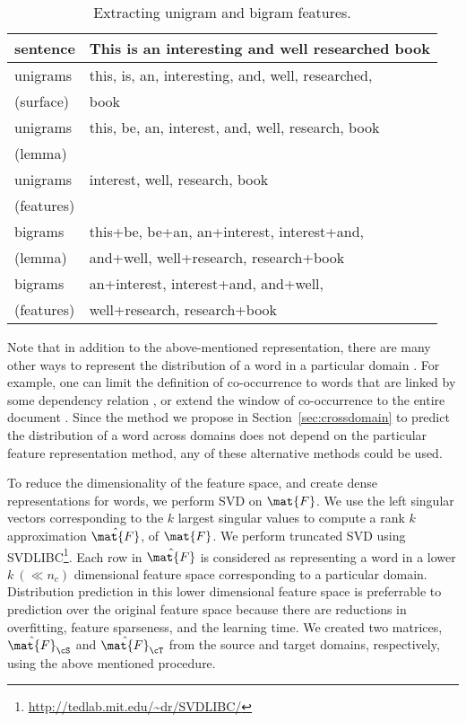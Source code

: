\documentclass[11pt]{article}
\begin{document}
\begin{table}[t]
\small
\begin{center}
\begin{tabular}{|p{11mm}|p{59mm}|} \hline
sentence   & This is an interesting and well researched book \\ \hline \hline
unigrams   & this, is, an, interesting, and, well, researched, \\
 (surface) & book\\  \hline
unigrams   & this, be, an, interest, and, well, research, book\\
 (lemma)   & \\ \hline
unigrams   & interest, well, research, book \\
 (features) & \\ \hline
bigrams     & this+be, be+an, an+interest, interest+and, \\
 (lemma)    & and+well, well+research, research+book \\ \hline
bigrams     & an+interest, interest+and, and+well, \\
 (features) & well+research, research+book \\ \hline
\end{tabular}
\end{center}
\caption{Extracting unigram and bigram features.}
\label{tbl:indomain}
\end{table}


Note that in addition to the above-mentioned representation, there are many other ways to
represent the distribution of a word in a particular domain \cite{Turney:JAIR:2010}.
For example, one can limit the definition of co-occurrence to words that are linked by some dependency relation \cite{pado:2007}, 
or extend the window of co-occurrence to the entire document \cite{Baroni:DM}.
Since the method we propose in Section~\ref{sec:crossdomain} to predict the distribution of a word across domains
does not depend on the particular feature representation method, any of these alternative methods could be used.

To reduce the dimensionality of the feature space, and create dense representations for words,
we perform SVD on $\mat{F}$. We use the left singular vectors corresponding to the $k$ largest
singular values to compute a rank $k$ approximation  $\hat{\mat{F}}$, of $\mat{F}$.
We perform truncated SVD using SVDLIBC\footnote{\url{http://tedlab.mit.edu/~dr/SVDLIBC/}}. 
Each row in $\hat{\mat{F}}$ is considered as representing a word in a 
lower $k\ ({\ll}n_{c})$ dimensional  feature space corresponding to a particular domain.
 Distribution prediction in this lower dimensional feature space is preferrable 
 to prediction over the original feature space because there are reductions in overfitting, feature sparseness, and the learning time.
 We created two matrices, $\hat{\mat{F}}_{\cS}$ and $\hat{\mat{F}}_{\cT}$
 from the source and target domains, respectively, using the above mentioned procedure.
 
\end{document}
